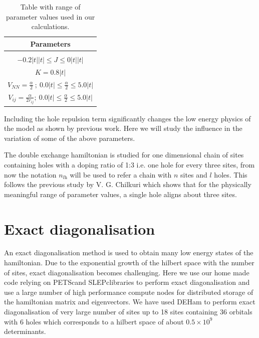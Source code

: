 \documentclass[12pt,twoside]{report}
\newcommand{\citepetsc}{\cite{petsc_web_page,petsc_user_ref,petsc_efficient}}
\newcommand{\citeslepc}{\cite{Hernandez_2003_SSL,slepc_users_manual}}
\begin{document}
	\begin{table}[h!]
		\centering
		\begin{tabular}{||c||}
			\hline
			Parameters  \\ [0.5ex]
			\hline\hline
			\\
			$ -0.2|t|\lvert t \rvert \le J \le 0|t|\lvert t \rvert $    \\ [1ex]
			$  K = 0.8 |t| $                                    \\ [1ex]
			$ V_{NN} = \frac{\alpha}{2}\ ;\ 0.0|t| \le \frac{\alpha}{2} \le 5.0|t| $ \\ [1ex]
			$ V_{ij} = \frac{\alpha}{2r_{ij}} ;\ 0.0|t| \le \frac{\alpha}{2} \le 5.0|t|$                                \\ [1ex]
			\hline
		\end{tabular}
		\label{tab:params}
		\caption{Table with range of parameter values used in our calculations.}
	\end{table}
	
	Including the hole repulsion term significantly changes the low energy physics
	of the model as shown by previous work\cite{calzado_proposal_2001}. Here we will
	study the influence in the variation of some of the above parameters.
	
	
	
	The double exchange hamiltonian is studied for one dimensional chain of
	sites containing holes with a doping ratio of 1:3 i.e. one hole for every
	three sites, from now the notation $n_{l\text{h}}$ will be used to refer a chain
	with $n$ sites and $l$ holes. This follows the previous study by V. G.
	Chilkuri which shows that for the physically meaningful range of parameter
	values, a single hole aligns about three sites.\cite{crystals_chilkuri}
	
	\section{Exact diagonalisation}
	
	An exact diagonalisation method is used to obtain many low energy states of
	the hamiltonian. Due to the exponential growth of the hilbert space with the
	number of sites, exact diagonalisation becomes challenging. Here we use our
	home made code relying on PETSc\citepetsc and SLEPc\citeslepc libraries to
	perform exact diagonalisation and use a large number of high performance
	compute nodes for distributed storage of the hamiltonian matrix and
	eigenvectors. We have used DEHam\cite{DEHamam} to perform exact
	diagonalisation of very large number of sites up to 18 sites containing 36
	orbitals with 6 holes which corresponds to a hilbert space of about $0.5
	\times 10^9$ determinants.
	
\end{document}
